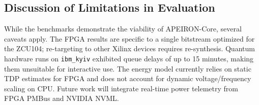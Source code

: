 \subsection{Discussion of Limitations in Evaluation}

While the benchmarks demonstrate the viability of APEIRON-Core, several caveats apply. The FPGA results are specific to a single bitstream optimized for the ZCU104; re-targeting to other Xilinx devices requires re-synthesis. Quantum hardware runs on \texttt{ibm\_kyiv} exhibited queue delays of up to 15 minutes, making them unsuitable for interactive use. The energy model currently relies on static TDP estimates for FPGA and does not account for dynamic voltage/frequency scaling on CPU. Future work will integrate real-time power telemetry from FPGA PMBus and NVIDIA NVML.